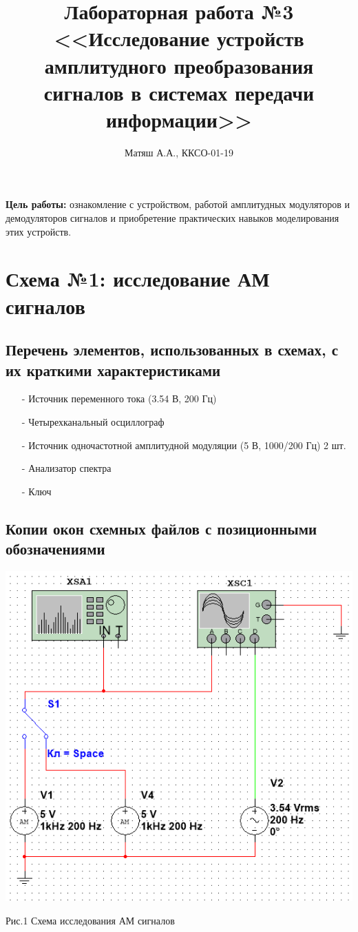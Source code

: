 \documentclass[11pt]{article}
\title{\textbf{Лабораторная работа №3\\<<Исследование устройств амплитудного преобразования сигналов в системах передачи информации>>}}
\author{Матяш А.А., ККСО-01-19}
\date{}
\begin{document}
\maketitle
\thispagestyle{empty}
\textbf{Цель работы:} ознакомление с устройством, работой амплитудных 
модуляторов и демодуляторов сигналов и приобретение практических навыков 
моделирования этих устройств.

\section{Схема №1: исследование АМ сигналов}
\subsection{Перечень элементов, использованных в схемах, с
их краткими характеристиками}
\begin{itemize}
    \item[-] Источник переменного тока (3.54 В, 200 Гц)
    \item[-] Четырехканальный осциллограф
    \item[-] Источник одночастотной амплитудной модуляции (5 В, 1000/200 Гц) 2 шт.
    \item[-] Анализатор спектра 
    \item[-] Ключ
\end{itemize}


\subsection{Копии окон схемных файлов с позиционными обозначениями}
\includegraphics[width=1\linewidth]{img/first.png}
\begin{center}
    Рис.1 Схема исследования АМ сигналов
\end{center}
\end{document}
